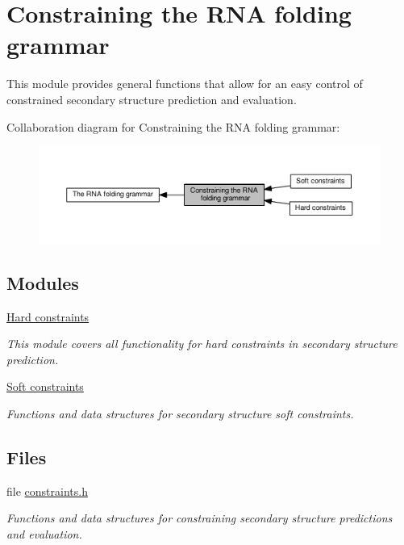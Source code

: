 \hypertarget{group__constraints}{}\section{Constraining the R\+NA folding grammar}
\label{group__constraints}


This module provides general functions that allow for an easy control of constrained secondary structure prediction and evaluation.  


Collaboration diagram for Constraining the R\+NA folding grammar\+:
\nopagebreak
\begin{figure}[H]
\begin{center}
\leavevmode
\includegraphics[width=350pt]{group__constraints}
\end{center}
\end{figure}
\subsection*{Modules}
\begin{DoxyCompactItemize}
\item 
\hyperlink{group__hard__constraints}{Hard constraints}
\begin{DoxyCompactList}\small\item\em This module covers all functionality for hard constraints in secondary structure prediction. \end{DoxyCompactList}\item 
\hyperlink{group__soft__constraints}{Soft constraints}
\begin{DoxyCompactList}\small\item\em Functions and data structures for secondary structure soft constraints. \end{DoxyCompactList}\end{DoxyCompactItemize}
\subsection*{Files}
\begin{DoxyCompactItemize}
\item 
file \hyperlink{constraints_8h}{constraints.\+h}
\begin{DoxyCompactList}\small\item\em Functions and data structures for constraining secondary structure predictions and evaluation. \end{DoxyCompactList}\end{DoxyCompactItemize}
